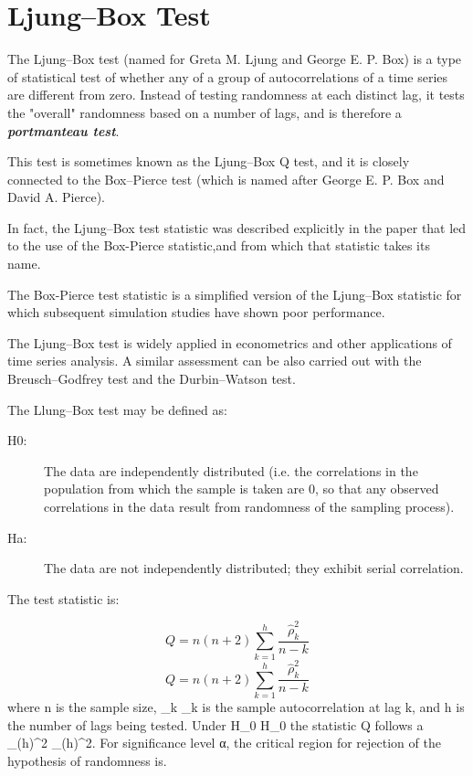 \section*{Ljung–Box Test}
The Ljung–Box test (named for Greta M. Ljung and George E. P. Box) is a type of statistical test of whether any of a group of autocorrelations of a time series are different from zero. Instead of testing randomness at each distinct lag, it tests the "overall" randomness based on a number of lags, and is therefore a \textbf{\textit{portmanteau test}}.

This test is sometimes known as the Ljung–Box Q test, and it is closely connected to the Box–Pierce test (which is named after George E. P. Box and David A. Pierce). 

In fact, the Ljung–Box test statistic was described explicitly in the paper that led to the use of the Box-Pierce statistic,and from which that statistic takes its name. 

The Box-Pierce test statistic is a simplified version of the Ljung–Box statistic for which subsequent simulation studies have shown poor performance.

The Ljung–Box test is widely applied in econometrics and other applications of time series analysis. A similar assessment can be also carried out with the Breusch–Godfrey test and the Durbin–Watson test.

The Llung–Box test may be defined as:

\begin{description}
\item[H0:] The data are independently distributed (i.e. the correlations in the population from which the sample is taken are 0, so that any observed correlations in the data result from randomness of the sampling process).
\item[Ha:] The data are not independently distributed; they exhibit serial correlation.
\end{description}
The test statistic is:

\[{\displaystyle Q=n\left(n+2\right)\sum _{k=1}^{h}{\frac {{\hat {\rho }}_{k}^{2}}{n-k}}} \]
\[Q = n\left(n+2\right)\sum_{k=1}^h\frac{\hat{\rho}^2_k}{n-k}\]
where n is the sample size, {\displaystyle {\hat {\rho }}_{k}} \hat{\rho}_k is the sample autocorrelation at lag k, and h is the number of lags being tested. Under {\displaystyle H_{0}} H_{0} the statistic Q follows a {\displaystyle \chi _{(h)}^{2}} \chi _{{(h)}}^{2}. For significance level α, the critical region for rejection of the hypothesis of randomness is.

